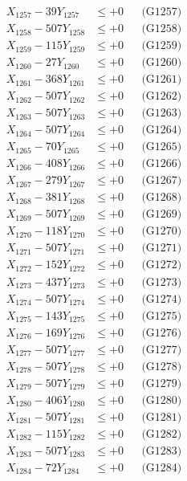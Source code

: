 \documentclass[a4paper,10pt]{article}
\begin{document}
{\begin{align}
X_{1257} - 39Y_{1257} &\leq +0 && \text{(G1257)} \\
X_{1258} - 507Y_{1258} &\leq +0 && \text{(G1258)} \\
X_{1259} - 115Y_{1259} &\leq +0 && \text{(G1259)} \\
X_{1260} - 27Y_{1260} &\leq +0 && \text{(G1260)} \\
\allowbreak
X_{1261} - 368Y_{1261} &\leq +0 && \text{(G1261)} \\
X_{1262} - 507Y_{1262} &\leq +0 && \text{(G1262)} \\
X_{1263} - 507Y_{1263} &\leq +0 && \text{(G1263)} \\
X_{1264} - 507Y_{1264} &\leq +0 && \text{(G1264)} \\
X_{1265} - 70Y_{1265} &\leq +0 && \text{(G1265)} \\
X_{1266} - 408Y_{1266} &\leq +0 && \text{(G1266)} \\
X_{1267} - 279Y_{1267} &\leq +0 && \text{(G1267)} \\
X_{1268} - 381Y_{1268} &\leq +0 && \text{(G1268)} \\
X_{1269} - 507Y_{1269} &\leq +0 && \text{(G1269)} \\
X_{1270} - 118Y_{1270} &\leq +0 && \text{(G1270)} \\
\allowbreak
X_{1271} - 507Y_{1271} &\leq +0 && \text{(G1271)} \\
X_{1272} - 152Y_{1272} &\leq +0 && \text{(G1272)} \\
X_{1273} - 437Y_{1273} &\leq +0 && \text{(G1273)} \\
X_{1274} - 507Y_{1274} &\leq +0 && \text{(G1274)} \\
X_{1275} - 143Y_{1275} &\leq +0 && \text{(G1275)} \\
X_{1276} - 169Y_{1276} &\leq +0 && \text{(G1276)} \\
X_{1277} - 507Y_{1277} &\leq +0 && \text{(G1277)} \\
X_{1278} - 507Y_{1278} &\leq +0 && \text{(G1278)} \\
X_{1279} - 507Y_{1279} &\leq +0 && \text{(G1279)} \\
X_{1280} - 406Y_{1280} &\leq +0 && \text{(G1280)} \\
\allowbreak
X_{1281} - 507Y_{1281} &\leq +0 && \text{(G1281)} \\
X_{1282} - 115Y_{1282} &\leq +0 && \text{(G1282)} \\
X_{1283} - 507Y_{1283} &\leq +0 && \text{(G1283)} \\
X_{1284} - 72Y_{1284} &\leq +0 && \text{(G1284)} \\

\end{align}}
\end{document}
